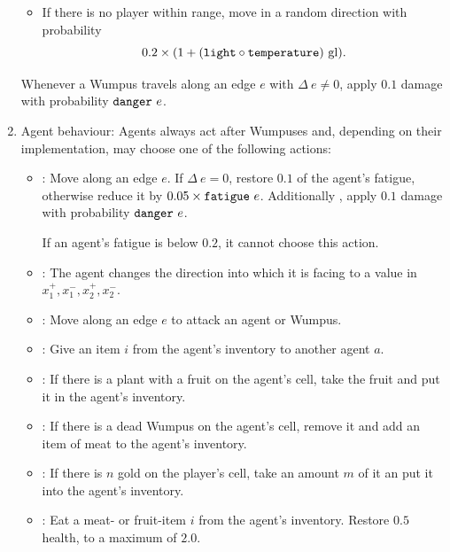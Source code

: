\begin{definition}
\begin{enumerate}
\begin{itemize}
		\item If there is no player within range, move in a random direction with probability
		$$
			0.2 \times (1 + (\field{light} \circ \field{temperature})\ \mathrm{gl}).
		$$
	\end{itemize}
	
	Whenever a Wumpus travels along an edge $e$ with $\Delta\ e \neq 0$, apply $0.1$ damage with probability $\field{danger}\ e$.
	
	\item {\upshape Agent behaviour:} Agents always act after Wumpuses and, depending on their implementation, may choose one of the following actions:
	
	\begin{itemize}\label{lst:agentBehavior}
		\item {}: Move along an edge $e$. If $\Delta\ e = 0$, restore $0.1$ of the agent's fatigue, otherwise reduce it by $0.05 \times \mathtt{fatigue}\ e$. Additionally , apply $0.1$ damage with probability $\field{danger}\ e$.
		
		If an agent's fatigue is below $0.2$, it cannot choose this action.
		
		\item{}: The agent changes the direction into which it is facing to a value in ${x_1^+,x_1^-,x_2^+,x_2^-}$.
		
		\item{}: Move along an edge $e$ to attack an agent or Wumpus.
		
		\item{}: Give an item $i$ from the agent's inventory to another agent $a$.
		
		\item{}: If there is a plant with a fruit on the agent's cell, take the fruit and put it in the agent's inventory.
		
		\item{}: If there is a dead Wumpus on the agent's cell, remove it and add an item of meat to the agent's inventory.
		
		\item{}: If there is $n$ gold on the player's cell, take an amount $m$  of it an put it into the agent's inventory.
		
		\item{}: Eat a meat- or fruit-item $i$ from the agent's inventory. Restore $0.5$ health, to a maximum of $2.0$.
		

\end{itemize}
\end{enumerate}
\end{definition}
